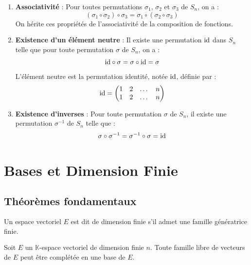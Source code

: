 \documentclass[11pt,a4paper]{report}
\begin{document}
\begin{property}
    \begin{enumerate}
        \item \textbf{Associativité} : Pour toutes permutations $\sigma_1$, $\sigma_2$ et $\sigma_3$ de $S_n$, on a :
        $$(\sigma_1 \circ \sigma_2) \circ \sigma_3 = \sigma_1 \circ (\sigma_2 \circ \sigma_3)$$
        On hérite ces propriétés de l'associativité de la composition de fonctions.
        \item \textbf{Existence d'un élément neutre} : Il existe une permutation $\mathrm{id}$ dans $S_n$ telle que pour toute permutation $\sigma$ de $S_n$, on a :
        $$\mathrm{id} \circ \sigma = \sigma \circ \mathrm{id} = \sigma$$
        L'élément neutre est la permutation identité, notée $\mathrm{id}$, définie par :
        $$\mathrm{id} = \left(\begin{matrix} 1 & 2 & \dots & n \\ 1 & 2 & \dots & n \end{matrix}\right)$$
        \item \textbf{Existence d'inverses} : Pour toute permutation $\sigma$ de $S_n$, il existe une permutation $\sigma^{-1}$ de $S_n$ telle que :
        $$\sigma \circ \sigma^{-1} = \sigma^{-1} \circ \sigma = \mathrm{id}$$
    \end{enumerate}
\end{property}

\chapter{Bases et Dimension Finie}

\section{Théorèmes fondamentaux}

\begin{definition}
Un espace vectoriel $E$ est dit de dimension finie s'il admet une famille génératrice finie.
\end{definition}


\begin{theorem}
Soit $E$ un $\mathbb{K}$-espace vectoriel de dimension finie $n$. Toute famille libre de vecteurs de $E$ peut être complétée en une base de $E$.
\end{theorem}
\end{document}
